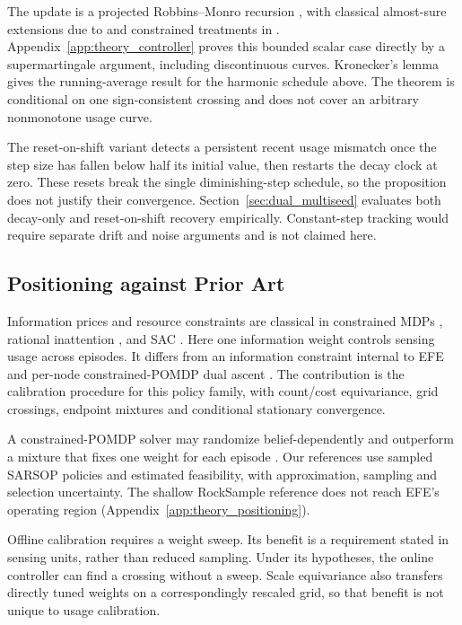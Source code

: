 \documentclass[manuscript, screen, review]{jair}
\begin{document}
The update is a projected Robbins--Monro recursion \citep{robbins1951}, with classical almost-sure extensions due to \citet{blum1954} and constrained treatments in \citet{kushner1978}. Appendix~\ref{app:theory_controller} proves this bounded scalar case directly by a supermartingale argument, including discontinuous curves. Kronecker's lemma gives the running-average result for the harmonic schedule above. The theorem is conditional on one sign-consistent crossing and does not cover an arbitrary nonmonotone usage curve.

The reset-on-shift variant detects a persistent recent usage mismatch once the step size has fallen below half its initial value, then restarts the decay clock at zero. These resets break the single diminishing-step schedule, so the proposition does not justify their convergence. Section~\ref{sec:dual_multiseed} evaluates both decay-only and reset-on-shift recovery empirically. Constant-step tracking would require separate drift and noise arguments and is not claimed here.

\subsection{Positioning against Prior Art}
\label{sec:budget_positioning}

Information prices and resource constraints are classical in constrained MDPs \citep{altman1999}, rational inattention \citep{sims2003,matejka2015}, and SAC \citep{haarnoja2018sac}. Here one information weight controls sensing usage across episodes. It differs from an information constraint internal to EFE \citep{kouw2026bethe} and per-node constrained-POMDP dual ascent \citep{stocco2024recursive}. The contribution is the calibration procedure for this policy family, with count/cost equivariance, grid crossings, endpoint mixtures and conditional stationary convergence.

A constrained-POMDP solver may randomize belief-dependently and outperform a mixture that fixes one weight for each episode \citep{kim2011cpomdp}. Our references use sampled SARSOP policies and estimated feasibility, with approximation, sampling and selection uncertainty. The shallow RockSample reference does not reach EFE's operating region (Appendix~\ref{app:theory_positioning}).

Offline calibration requires a weight sweep. Its benefit is a requirement stated in sensing units, rather than reduced sampling. Under its hypotheses, the online controller can find a crossing without a sweep. Scale equivariance also transfers directly tuned weights on a correspondingly rescaled grid, so that benefit is not unique to usage calibration.
\end{document}
